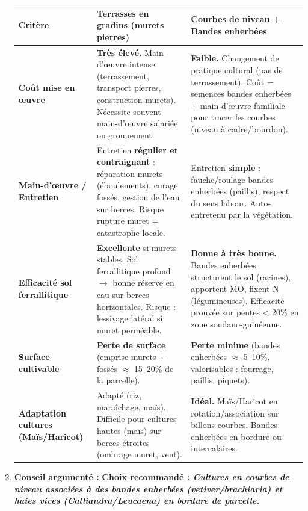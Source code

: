 \documentclass[11pt]{article}
\begin{document}
\begin{corrige}
\begin{enumerate}
    \begin{center}
    \begin{tabularx}{\linewidth}{|>{\bfseries}l|X|X|}\hline
    \textbf{Critère} & \textbf{Terrasses en gradins (murets pierres)} & \textbf{Courbes de niveau + Bandes enherbées} \\ \hline
    \textbf{Coût mise en œuvre} & \textbf{Très élevé.} Main-d'œuvre intense (terrassement, transport pierres, construction murets). Nécessite souvent main-d'œuvre salariée ou groupement. & \textbf{Faible.} Changement de pratique cultural (pas de terrassement). Coût = semences bandes enherbées + main-d'œuvre familiale pour tracer les courbes (niveau à cadre/bourdon). \\ \hline
    \textbf{Main-d'œuvre / Entretien} & Entretien \textbf{régulier et contraignant} : réparation murets (éboulements), curage fossés, gestion de l'eau sur berces. Risque rupture muret = catastrophe locale. & Entretien \textbf{simple} : fauche/roulage bandes enherbées (paillis), respect du sens labour. Auto-entretenu par la végétation. \\ \hline
    \textbf{Efficacité sol ferrallitique} & \textbf{Excellente} si murets stables. Sol ferrallitique profond $\rightarrow$ bonne réserve en eau sur berces horizontales. Risque : lessivage latéral si muret perméable. & \textbf{Bonne à très bonne.} Bandes enherbées structurent le sol (racines), apportent MO, fixent N (légumineuses). Efficacité prouvée sur pentes < 20\% en zone soudano-guinéenne. \\ \hline
    \textbf{Surface cultivable} & \textbf{Perte de surface} (emprise murets + fossés $\approx$ 15--20\% de la parcelle). & \textbf{Perte minime} (bandes enherbées $\approx$ 5--10\%, valorisables : fourrage, paillis, piquets). \\ \hline
    \textbf{Adaptation cultures (Maïs/Haricot)} & Adapté (riz, maraîchage, maïs). Difficile pour cultures hautes (maïs) sur berces étroites (ombrage muret, vent). & \textbf{Idéal.} Maïs/Haricot en rotation/association sur billons courbes. Bandes enherbées en bordure ou intercalaires. \\ \hline
    \end{tabularx}
    \end{center}

    \item \textbf{Conseil argumenté :}
    \textbf{Choix recommandé : \emph{Cultures en courbes de niveau associées à des bandes enherbées (vetiver/brachiaria) et haies vives (Calliandra/Leucaena) en bordure de parcelle.}}


\end{enumerate}
\end{corrige}
\end{document}
